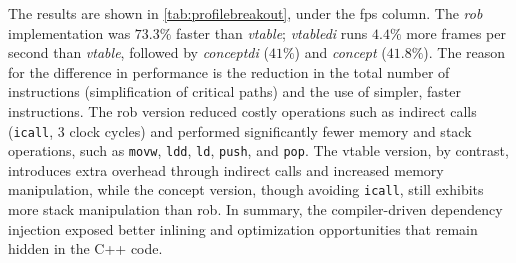 \documentclass[sigconf]{acmart}
\begin{document}
The results are shown in \autoref{tab:profilebreakout}, under the fps column. The \emph{rob} implementation was $73.3\%$ faster than \emph{vtable}; \emph{vtabledi} runs $4.4\%$ more frames per second than \emph{vtable}, followed by \emph{conceptdi} ($41\%$) and \emph{concept} ($41.8\%$). The reason for the difference in performance is the reduction in the total number of instructions (simplification of critical paths) and the use of simpler, faster instructions. The rob version reduced costly operations such as indirect calls ({\tt icall}, 3 clock cycles) and performed significantly fewer memory and stack operations, such as {\tt movw}, {\tt ldd}, {\tt ld}, {\tt push}, and {\tt pop}. The vtable version, by contrast, introduces extra overhead through indirect calls and increased memory manipulation, while the concept version, though avoiding {\tt icall}, still exhibits more stack manipulation than rob. In summary, the compiler-driven dependency injection exposed better inlining and optimization opportunities that remain hidden in the C++ code.
\end{document}
